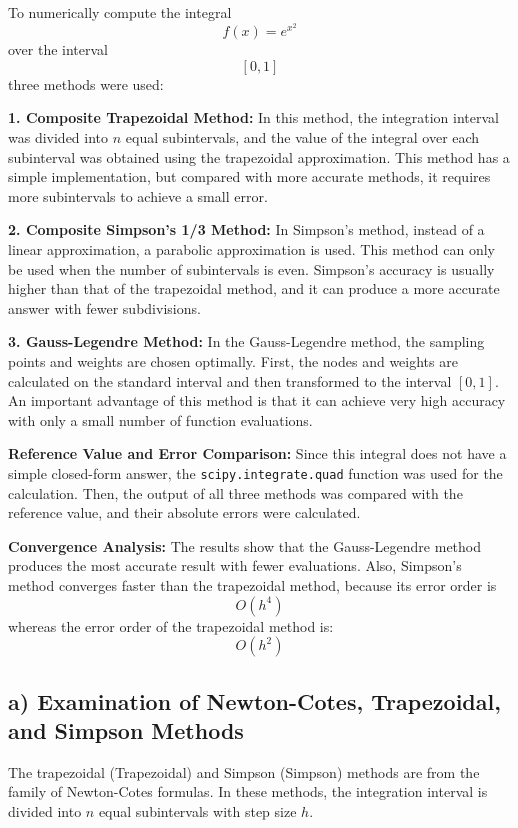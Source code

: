 \documentclass[12pt,a4paper]{article}
\begin{document}
	To numerically compute the integral
	\[
	f(x)=e^{x^2}
	\]
	over the interval
	\[
	[0,1]
	\]
	three methods were used:
	
	\textbf{1. Composite Trapezoidal Method:}
	In this method, the integration interval was divided into
	$n$
	equal subintervals, and the value of the integral over each subinterval was obtained using the trapezoidal approximation. This method has a simple implementation, but compared with more accurate methods, it requires more subintervals to achieve a small error.
	
	\textbf{2. Composite Simpson's 1/3 Method:}
	In Simpson's method, instead of a linear approximation, a parabolic approximation is used. This method can only be used when the number of subintervals is even. Simpson's accuracy is usually higher than that of the trapezoidal method, and it can produce a more accurate answer with fewer subdivisions.
	
	\textbf{3. Gauss-Legendre Method:}
	In the Gauss-Legendre method, the sampling points and weights are chosen optimally. First, the nodes and weights are calculated on the standard interval and then transformed to the interval
	$[0,1]$.
	An important advantage of this method is that it can achieve very high accuracy with only a small number of function evaluations.
	
	\textbf{Reference Value and Error Comparison:}
	Since this integral does not have a simple closed-form answer, the
	\texttt{scipy.integrate.quad}
	function was used for the calculation. Then, the output of all three methods was compared with the reference value, and their absolute errors were calculated.
	
	\textbf{Convergence Analysis:}
	The results show that the Gauss-Legendre method produces the most accurate result with fewer evaluations. Also, Simpson's method converges faster than the trapezoidal method, because its error order is
	\[
	O(h^4)
	\]
	whereas the error order of the trapezoidal method is:
	\[
	O(h^2)
	\]
	
	\subsection*{a) Examination of Newton-Cotes, Trapezoidal, and Simpson Methods}
	
	The trapezoidal
	(Trapezoidal)
	and Simpson
	(Simpson)
	methods are from the family of Newton-Cotes formulas. In these methods, the integration interval is divided into
	$n$
	equal subintervals with step size
	$h$.
	
\end{document}
